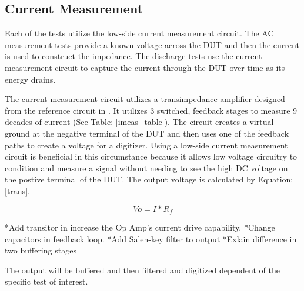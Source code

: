 \subsection{Current Measurement}

Each of the tests utilize the low-side current measurement circuit. The AC measurement tests provide a known voltage across the DUT and then the current is used to construct the impedance. The discharge tests use the current measurement circuit to capture the current through the DUT over time as its energy drains. 



The current measurement circuit utilizes a transimpedance amplifier designed from the reference circuit in \cite{steve_thesis}. It utilizes 3 switched, feedback stages to measure 9 decades of current (See Table: \ref{imeas_table}). The circuit creates a virtual ground at the negative terminal of the DUT and then uses one of the feedback paths to create a voltage for a digitizer. Using a low-side current measurement circuit is beneficial in this circumstance because it allows low voltage circuitry to condition and measure a signal without needing to see the high DC voltage on the postive terminal of the DUT. The output voltage is calculated by Equation: \eqref{trans}.

\begin{equation}
\label{trans}
Vo = I*R_f
\end{equation}

*Add transitor in increase the Op Amp's current drive capability.
*Change capacitors in feedback loop.
*Add Salen-key filter to output
*Exlain difference in two buffering stages


The output will be buffered and then filtered and digitized dependent of the specific test of interest.

